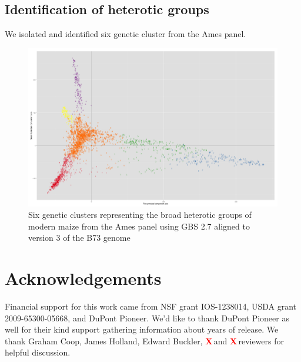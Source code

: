 \documentclass[9pt,twocolumn,twoside]{gsajnl}
\newcommand{\X}{\textcolor{red}{\bf X\,}}
\begin{document}
\subsection{Identification of heterotic groups}
We isolated and identified six genetic cluster from the Ames panel.
\begin{figure}[htbp]
\centering
\includegraphics[width=\linewidth]{6_clusters_placeholder.png}
\caption{Six genetic clusters representing the broad heterotic groups of modern maize from the Ames panel using GBS 2.7 aligned to version 3 of the B73 genome 
}
\label{fig:6clusters}
\end{figure}



\section*{Acknowledgements}
Financial support for this work came from NSF grant IOS-1238014, USDA grant 2009-65300-05668, and DuPont Pioneer.  We'd like to thank DuPont Pioneer as well for their kind support gathering information about years of release. We thank Graham Coop, James Holland, Edward Buckler, \X and \X reviewers for helpful discussion. 


\end{document}
